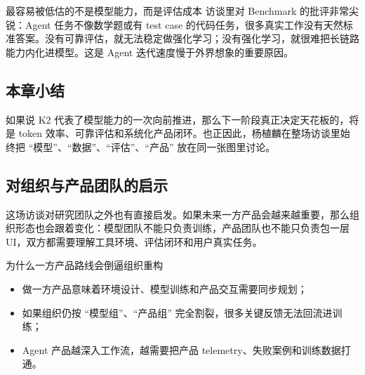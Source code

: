 \begin{warningbox}{最容易被低估的不是模型能力，而是评估成本}
访谈里对 Benchmark 的批评非常尖锐：Agent 任务不像数学题或有 test case 的代码任务，很多真实工作没有天然标准答案。没有可靠评估，就无法稳定做强化学习；没有强化学习，就很难把长链路能力内化进模型。这是 Agent 迭代速度慢于外界想象的重要原因。
\end{warningbox}

\subsection{本章小结}
如果说 K2 代表了模型能力的一次向前推进，那么下一阶段真正决定天花板的，将是 token 效率、可靠评估和系统化产品闭环。也正因此，杨植麟在整场访谈里始终把 ``模型''、``数据''、``评估''、``产品'' 放在同一张图里讨论。

\subsection{对组织与产品团队的启示}
这场访谈对研究团队之外也有直接启发。如果未来一方产品会越来越重要，那么组织形态也会跟着变化：模型团队不能只负责训练，产品团队也不能只负责包一层 UI，双方都需要理解工具环境、评估闭环和用户真实任务。

\begin{knowledgebox}{为什么一方产品路线会倒逼组织重构}
\begin{itemize}
    \item 做一方产品意味着环境设计、模型训练和产品交互需要同步规划；
    \item 如果组织仍按 ``模型组''、``产品组'' 完全割裂，很多关键反馈无法回流进训练；
    \item Agent 产品越深入工作流，越需要把产品 telemetry、失败案例和训练数据打通。
\end{itemize}
\end{knowledgebox}

